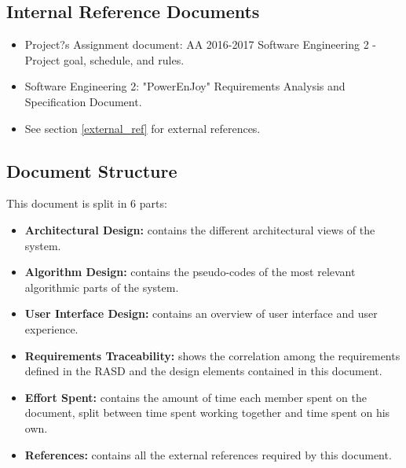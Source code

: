 \subsection{Internal Reference Documents}
\label{internal_ref}
\begin{itemize}
    \item Project?s Assignment document: AA 2016-2017 Software Engineering 2 - Project goal, schedule, and rules.
    \item Software Engineering 2: "PowerEnJoy" Requirements Analysis and Specification Document.
    \item See section \ref{external_ref} for external references.
\end{itemize}

\subsection{Document Structure}
This document is split in 6 parts:
\begin{itemize}
    \item \textbf{Architectural Design:} contains the different architectural views of the system.
    \item \textbf{Algorithm Design:} contains the pseudo-codes of the most relevant algorithmic parts of the system.
    \item \textbf{User Interface Design:} contains an overview of user interface and user experience.
    \item \textbf{Requirements Traceability:} shows the correlation among the requirements defined in the RASD and the design elements contained in this document.
    \item \textbf{Effort Spent:} contains the amount of time each member spent on the document, split between time spent working together and time spent on his own.
    \item \textbf{References:} contains all the external references required by this document.
\end{itemize}